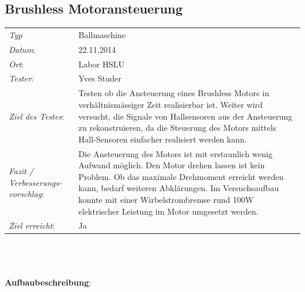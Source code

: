 \subsection{Brushless Motoransteuerung}

\begin{tabular}{p{3.6cm}p{9.4cm}}
\textit{Typ}              & Ballmaschine\\ 
\textit{Datum}:           & 22.11.2014\\
\textit{Ort}:             & Labor HSLU\\
\textit{Tester}:          & Yves Studer\\
\textit{Ziel des Testes}: & Testen ob die Ansteuerung eines Brushless Motors in verhältnismässiger Zeit realisierbar ist. Weiter wird versucht, die Signale von Hallsensoren aus der Ansteuerung zu rekonstruieren, da die Steuerung des Motors mittels Hall-Sensoren einfacher realisiert werden kann.\\
\textit{Fazit / Verbesserungs-\newline vorschlag}: & Die Ansteuerung des Motors ist mit erstaunlich wenig Aufwand möglich. Den Motor drehen lassen ist kein Problem. Ob das maximale Drehmoment erreicht werden kann, bedarf weiteren Abklärungen. Im Versuchsaufbau konnte mit einer Wirbelstrombremse rund 100W elektrischer Leistung im Motor umgesetzt werden. \\ 
\textit{Ziel erreicht}:& Ja\\
\end{tabular}\\
\\
\\
\textbf{Aufbaubeschreibung}:
